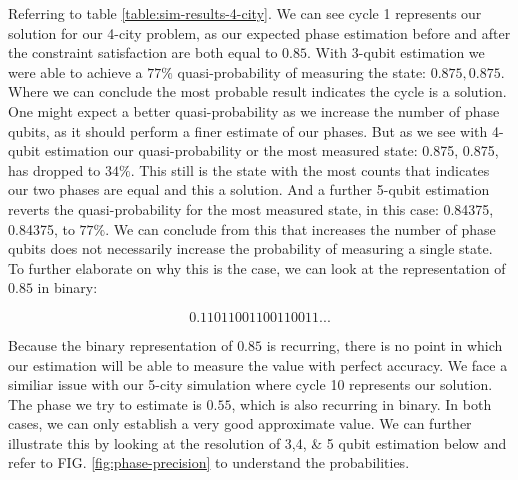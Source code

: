 \documentclass[msc,oneside]{ubcthesis}
\begin{document}
	Referring to table \ref{table:sim-results-4-city}. We can see cycle 1 represents our solution for our 4-city problem, as our expected phase estimation before and after the constraint satisfaction are both equal to $0.85$. With 3-qubit estimation we were able to achieve a $77\%$ quasi-probability of measuring the state: $0.875, 0.875$. Where we can conclude the most probable result indicates the cycle is a solution. One might expect a better quasi-probability as we increase the number of phase qubits, as it should perform a finer estimate of our phases. But as we see with 4-qubit estimation our quasi-probability or the most measured state: 0.875, 0.875, has dropped to $34\%$.  This still is the state with the most counts that indicates our two phases are equal and this a solution. And a further 5-qubit estimation reverts the quasi-probability for the most measured state, in this case: 0.84375, 0.84375, to $77\%$. We can conclude from this that increases the number of phase qubits does not necessarily increase the probability of measuring a single state. To further elaborate on why this is the case, we can look at the representation of $0.85$ in binary:
	
	$$0.11011001100110011...$$
	
	Because the binary representation of $0.85$ is recurring, there is no point in which our estimation will be able to measure the value with perfect accuracy. We face a similiar issue with our 5-city simulation where cycle 10 represents our solution. The phase we try to estimate is $0.55$, which is also recurring in binary. In both cases, we can only establish a very good approximate value. We can further illustrate this by looking at the resolution of 3,4, \& 5 qubit estimation below and refer to FIG. \ref{fig:phase-precision} to understand the probabilities.
	
	
\end{document}
